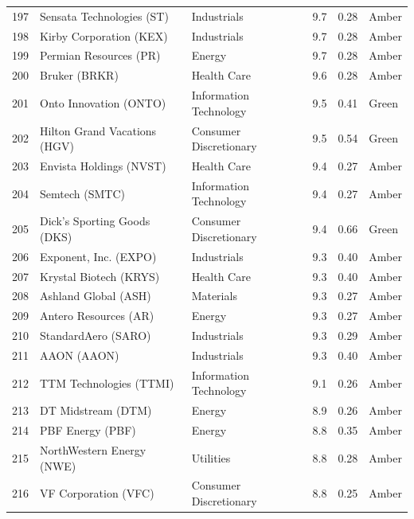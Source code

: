 \documentclass[11pt,a4paper]{article}
\begin{document}
{\begin{longtable}{r p{4.6cm} p{3cm} r r l}
197 & Sensata Technologies (ST) & Industrials & 9.7 & 0.28 & \cellcolor[HTML]{FFEB9C}Amber \\
198 & Kirby Corporation (KEX) & Industrials & 9.7 & 0.28 & \cellcolor[HTML]{FFEB9C}Amber \\
199 & Permian Resources (PR) & Energy & 9.7 & 0.28 & \cellcolor[HTML]{FFEB9C}Amber \\
200 & Bruker (BRKR) & Health Care & 9.6 & 0.28 & \cellcolor[HTML]{FFEB9C}Amber \\
201 & Onto Innovation (ONTO) & Information Technology & 9.5 & 0.41 & \cellcolor[HTML]{C6EFCE}Green \\
202 & Hilton Grand Vacations (HGV) & Consumer Discretionary & 9.5 & 0.54 & \cellcolor[HTML]{C6EFCE}Green \\
203 & Envista Holdings (NVST) & Health Care & 9.4 & 0.27 & \cellcolor[HTML]{FFEB9C}Amber \\
204 & Semtech (SMTC) & Information Technology & 9.4 & 0.27 & \cellcolor[HTML]{FFEB9C}Amber \\
205 & Dick's Sporting Goods (DKS) & Consumer Discretionary & 9.4 & 0.66 & \cellcolor[HTML]{C6EFCE}Green \\
206 & Exponent, Inc. (EXPO) & Industrials & 9.3 & 0.40 & \cellcolor[HTML]{FFEB9C}Amber \\
207 & Krystal Biotech (KRYS) & Health Care & 9.3 & 0.40 & \cellcolor[HTML]{FFEB9C}Amber \\
208 & Ashland Global (ASH) & Materials & 9.3 & 0.27 & \cellcolor[HTML]{FFEB9C}Amber \\
209 & Antero Resources (AR) & Energy & 9.3 & 0.27 & \cellcolor[HTML]{FFEB9C}Amber \\
210 & StandardAero (SARO) & Industrials & 9.3 & 0.29 & \cellcolor[HTML]{FFEB9C}Amber \\
211 & AAON (AAON) & Industrials & 9.3 & 0.40 & \cellcolor[HTML]{FFEB9C}Amber \\
212 & TTM Technologies (TTMI) & Information Technology & 9.1 & 0.26 & \cellcolor[HTML]{FFEB9C}Amber \\
213 & DT Midstream (DTM) & Energy & 8.9 & 0.26 & \cellcolor[HTML]{FFEB9C}Amber \\
214 & PBF Energy (PBF) & Energy & 8.8 & 0.35 & \cellcolor[HTML]{FFEB9C}Amber \\
215 & NorthWestern Energy (NWE) & Utilities & 8.8 & 0.28 & \cellcolor[HTML]{FFEB9C}Amber \\
216 & VF Corporation (VFC) & Consumer Discretionary & 8.8 & 0.25 & \cellcolor[HTML]{FFEB9C}Amber \\

\end{longtable}}
\end{document}
